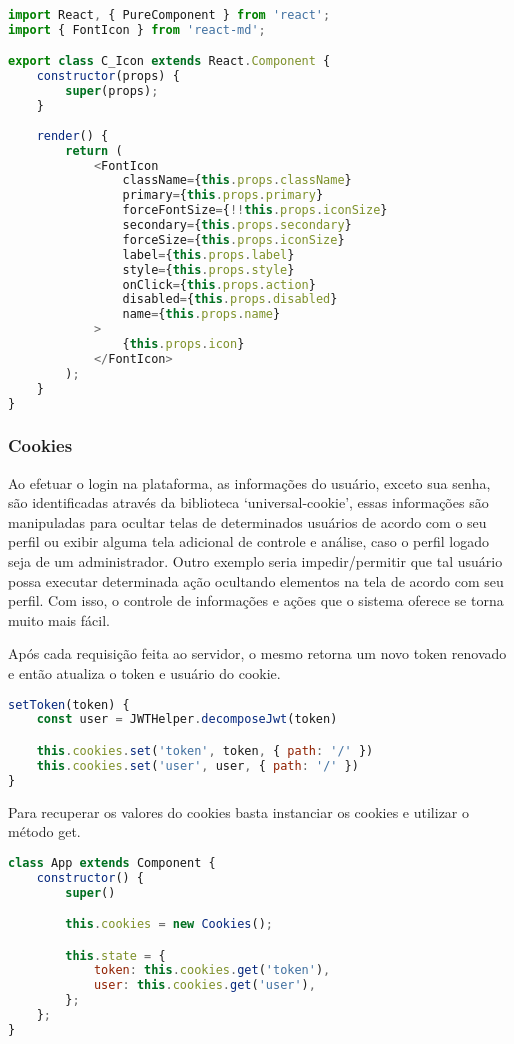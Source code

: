 \begin{lstlisting}[language=JavaScript, caption={Importando o componente de Ícone do react-md}]
import React, { PureComponent } from 'react';
import { FontIcon } from 'react-md';

export class C_Icon extends React.Component {
	constructor(props) {
		super(props);
	}
	
	render() {
		return (
			<FontIcon 
				className={this.props.className}
				primary={this.props.primary}
				forceFontSize={!!this.props.iconSize}
				secondary={this.props.secondary}
				forceSize={this.props.iconSize}
				label={this.props.label}
				style={this.props.style}
				onClick={this.props.action}
				disabled={this.props.disabled}
				name={this.props.name}
			>
				{this.props.icon}
			</FontIcon>
		);
	}
}
\end{lstlisting}

\subsubsection{Cookies}
Ao efetuar o login na plataforma, as informações do usuário, exceto sua senha, são identificadas através da biblioteca `universal-cookie', essas informações são manipuladas para ocultar telas de determinados usuários de acordo com o seu perfil ou exibir alguma tela adicional de controle e análise, caso o perfil logado seja de um administrador. Outro exemplo seria impedir/permitir que tal usuário possa executar determinada ação ocultando elementos na tela de acordo com seu perfil.
Com isso, o controle de informações e ações que o sistema oferece se torna muito mais fácil.

Após cada requisição feita ao servidor, o mesmo retorna um novo token renovado e então atualiza o token e usuário do cookie.

\begin{lstlisting}[language=JavaScript, caption={Gravar dados no cookie}]
setToken(token) {
	const user = JWTHelper.decomposeJwt(token)

	this.cookies.set('token', token, { path: '/' })
	this.cookies.set('user', user, { path: '/' })
}
\end{lstlisting}

Para recuperar os valores do cookies basta instanciar os cookies e utilizar o método get.

\begin{lstlisting}[language=JavaScript, caption={Recuperar dados do cookie}]
class App extends Component {
	constructor() {
		super()

		this.cookies = new Cookies();

		this.state = { 
			token: this.cookies.get('token'),
			user: this.cookies.get('user'),
		};
	};
}
\end{lstlisting}

